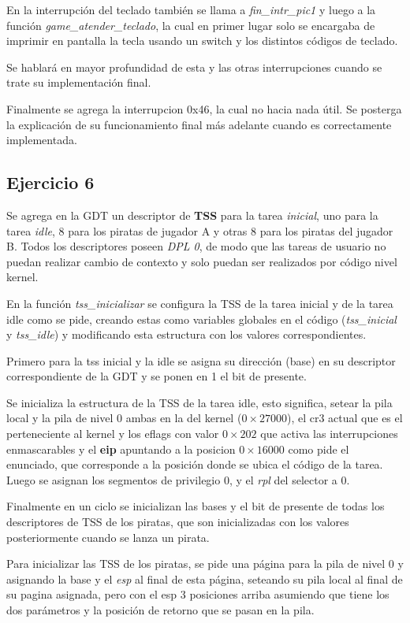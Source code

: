 En la interrupción del teclado también se llama a {\it fin_intr_pic1\/} y luego
a la función \hbox{\it game_atender_teclado\/}, la cual en primer lugar solo se
encargaba de imprimir en pantalla la tecla usando un switch y los distintos
códigos de teclado.

Se hablará en mayor profundidad de esta y las otras interrupciones cuando se
trate su implementación final.

Finalmente se agrega la interrupcion 0x46, la cual no hacia nada útil. Se
posterga la explicación de su funcionamiento final más adelante cuando es
correctamente implementada.


\subsection{Ejercicio 6}

Se agrega en la GDT un descriptor de {\bf TSS} para la tarea {\it inicial\/},
uno para la tarea {\it idle\/}, 8 para los piratas de jugador A y otras 8 para
los piratas del jugador B. Todos los descriptores poseen {\it DPL 0\/}, de modo
que las tareas de usuario no puedan realizar cambio de contexto y solo puedan
ser realizados por código nivel kernel.

En la función {\it tss_inicializar\/} se configura la TSS de la tarea inicial y
de la tarea idle como se pide, creando estas como variables globales en el
código ({\it tss_inicial} y {\it tss_idle}) y modificando esta estructura con
los valores correspondientes.

Primero para la tss inicial y la idle se asigna su dirección (base) en su
descriptor correspondiente de la GDT y se ponen en 1 el bit de presente.

Se inicializa la estructura de la TSS de la tarea idle, esto significa, setear
la pila local y la pila de nivel 0 ambas en la del kernel ($0\times27000$),
el cr3 actual que es el perteneciente al kernel y los eflags con valor
$0\times202$ que activa las interrupciones enmascarables y el {\bf eip}
apuntando a la posicion $0\times16000$ como pide el enunciado, que corresponde
a la posición donde se ubica el código de la tarea.
Luego se asignan los segmentos de privilegio 0, y el {\it rpl\/} del selector a
0.

Finalmente en un ciclo se inicializan las bases y el bit de presente de todas
los descriptores de TSS de los piratas, que son inicializadas con los valores
posteriormente cuando se lanza un pirata.

Para inicializar las TSS de los piratas, se pide una página para la pila de
nivel 0 y asignando la base y el {\it esp\/} al final de esta página, seteando
su pila local al final de su pagina asignada, pero con el esp 3 posiciones
arriba asumiendo que tiene los dos parámetros y la posición de retorno que se
pasan en la pila.

